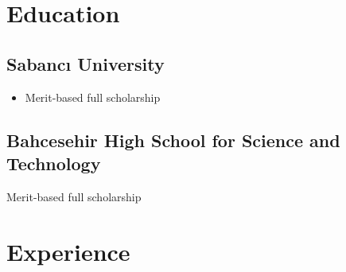 \documentclass[letterpaper]{deedy-resume} %
\begin{document}
\hfill
%
%
\begin{minipage}[t]{0.66\textwidth} %


\section{Education} 

\subsection{Sabancı University}


\begin{itemize}
\item Merit-based full scholarship
\end{itemize}

\sectionspace %


\subsection{Bahcesehir High School for Science and Technology}


\begin{tightitemize}
\item Merit-based full scholarship
\end{tightitemize}

\sectionspace %


\section{Experience}


\end{minipage}
\end{document}
